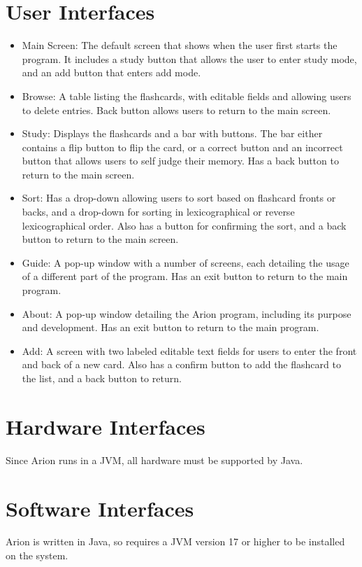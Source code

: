 \documentclass{scrreprt}
\begin{document}
\section{User Interfaces}
\begin{itemize}
    \item
        Main Screen: The default screen that shows when the user first starts the program.
        It includes a study button that allows the user to enter study mode,
        and an add button that enters add mode.
    \item 
        Browse: A table listing the flashcards, with editable fields and allowing users to 
        delete entries. Back button allows users to return to the main screen.
    \item
        Study: Displays the flashcards and a bar with buttons. The bar either contains a 
        flip button to flip the card, or a correct button and an incorrect button that
        allows users to self judge their memory. Has a back button to return to 
        the main screen.
    \item 
        Sort: Has a drop-down allowing users to sort based on flashcard fronts or backs,
        and a drop-down for sorting in lexicographical or reverse lexicographical order. 
        Also has a button for confirming the sort, and a back button to return to the main screen.
    \item 
        Guide: A pop-up window with a number of screens, each detailing the usage of a
        different part of the program. Has an exit button to return to the main program.
    \item 
        About: A pop-up window detailing the Arion program, including its purpose and development.
        Has an exit button to return to the main program.
    \item 
        Add: A screen with two labeled editable text fields for users to enter the front and
        back of a new card. Also has a confirm button to add the flashcard to the list, and
        a back button to return.
\end{itemize}

\section{Hardware Interfaces}
Since Arion runs in a JVM, all hardware must be supported by Java.

\section{Software Interfaces}
Arion is written in Java, so requires a JVM version 17 or higher to be installed on the system.
\end{document}
